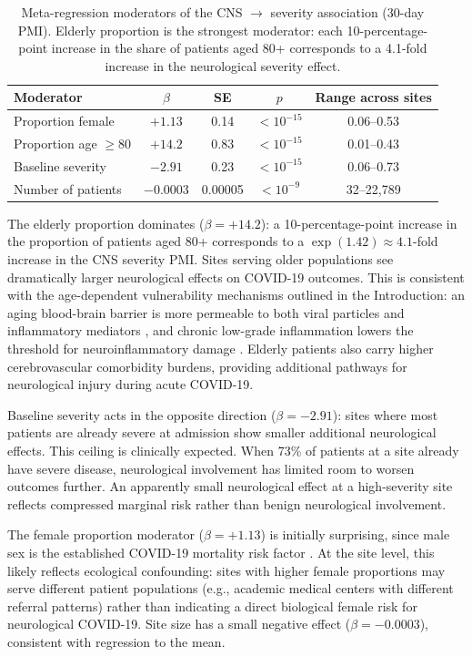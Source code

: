 \documentclass{article}
\begin{document}
\begin{table}[t]
\centering
\caption{Meta-regression moderators of the CNS $\to$ severity association (30-day PMI). Elderly proportion is the strongest moderator: each 10-percentage-point increase in the share of patients aged 80+ corresponds to a 4.1-fold increase in the neurological severity effect.}
\label{tab:moderators}
\begin{tabular}{lcccc}
\toprule
Moderator & $\beta$ & SE & $p$ & Range across sites \\
\midrule
Proportion female & $+1.13$ & 0.14 & $< 10^{-15}$ & 0.06--0.53 \\
Proportion age $\geq 80$ & $+14.2$ & 0.83 & $< 10^{-15}$ & 0.01--0.43 \\
Baseline severity & $-2.91$ & 0.23 & $< 10^{-15}$ & 0.06--0.73 \\
Number of patients & $-0.0003$ & 0.00005 & $< 10^{-9}$ & 32--22{,}789 \\
\bottomrule
\end{tabular}
\end{table}

The elderly proportion dominates ($\beta = +14.2$): a 10-percentage-point increase in the proportion of patients aged 80+ corresponds to a $\exp(1.42) \approx 4.1$-fold increase in the CNS severity PMI.
Sites serving older populations see dramatically larger neurological effects on COVID-19 outcomes.
This is consistent with the age-dependent vulnerability mechanisms outlined in the Introduction: an aging blood-brain barrier is more permeable to both viral particles and inflammatory mediators \cite{montagne2015bbb}, and chronic low-grade inflammation lowers the threshold for neuroinflammatory damage \cite{franceschi2018inflammaging}.
Elderly patients also carry higher cerebrovascular comorbidity burdens, providing additional pathways for neurological injury during acute COVID-19.

Baseline severity acts in the opposite direction ($\beta = -2.91$): sites where most patients are already severe at admission show smaller additional neurological effects.
This ceiling is clinically expected.
When 73\% of patients at a site already have severe disease, neurological involvement has limited room to worsen outcomes further.
An apparently small neurological effect at a high-severity site reflects compressed marginal risk rather than benign neurological involvement.

The female proportion moderator ($\beta = +1.13$) is initially surprising, since male sex is the established COVID-19 mortality risk factor \cite{takahashi2020sex, williamson2020opensafely}.
At the site level, this likely reflects ecological confounding: sites with higher female proportions may serve different patient populations (e.g., academic medical centers with different referral patterns) rather than indicating a direct biological female risk for neurological COVID-19.
Site size has a small negative effect ($\beta = -0.0003$), consistent with regression to the mean.
\end{document}
